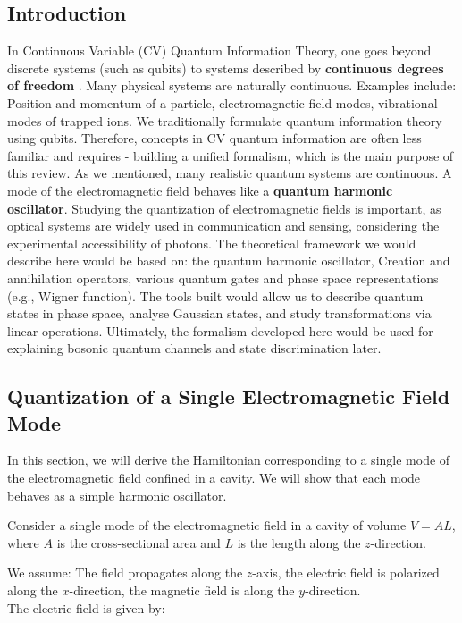 \subsection{Introduction}


In Continuous Variable (CV) Quantum Information Theory, one goes beyond discrete systems (such as qubits) to systems described by \textbf{continuous degrees of freedom}
. Many physical systems are naturally continuous. Examples include: Position and momentum of a particle, electromagnetic field modes, vibrational modes of trapped ions.
We traditionally formulate quantum information theory using qubits. Therefore, concepts in CV quantum information are often less familiar and requires - building a unified formalism, which is the main purpose of this review.
\newline
As we mentioned, many realistic quantum systems are continuous. A mode of the electromagnetic field behaves like a \textbf{quantum harmonic oscillator}. Studying the quantization of electromagnetic fields is important, as optical systems are widely used in communication and sensing, considering the experimental accessibility of photons. The theoretical framework we would describe here would be based on: the quantum harmonic oscillator, Creation and annihilation operators, various quantum gates and phase space representations (e.g., Wigner function). The tools built would allow us to describe quantum states in phase space, analyse Gaussian states, and study transformations via linear operations. Ultimately, the formalism developed here would be used for explaining bosonic quantum channels and state discrimination later.



\subsection{Quantization of a Single Electromagnetic Field Mode}

In this section, we will derive the Hamiltonian corresponding to a single mode of the electromagnetic field confined in a cavity. We will show that each mode behaves as a simple harmonic oscillator.

Consider a single mode of the electromagnetic field in a cavity of volume $V = AL$, where $A$ is the cross-sectional area and $L$ is the length along the $z$-direction.

We assume: The field propagates along the $z$-axis, the electric field is polarized along the $x$-direction, the magnetic field is along the $y$-direction.
\\
The electric field is given by:

